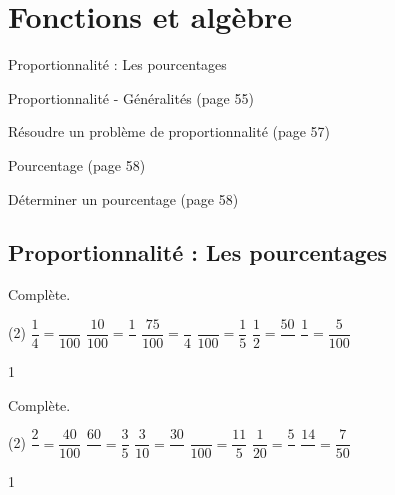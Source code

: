 \documentclass[a4paper,11pt]{report}
\begin{document}
\newcommand{\chapterName}{Fonctions et algèbre}
\newcommand{\serieName}{Proportionnalité : Les pourcentages}

\chapter*{\chapterName}
\thispagestyle{empty}

\begin{amL}{\serieName}{
\item Proportionnalité - Généralités (page 55)
\item Résoudre un problème de proportionnalité (page 57)
\item Pourcentage (page 58)
\item Déterminer un pourcentage (page 58)
}\end{amL}

\section*{\serieName}
\setcounter{page}{1}







\begin{exop}{
Complète.
\begin{tasks}(2)
    \task $\dfrac{1}{4}=\dfrac{}{100}$
    \task $\dfrac{10}{100}=\dfrac{1}{}$
    \task $\dfrac{75}{100}=\dfrac{}{4}$
    \task $\dfrac{}{100}=\dfrac{1}{5}$
    \task $\dfrac{1}{2}=\dfrac{50}{}$
    \task $\dfrac{1}{}=\dfrac{5}{100}$
\end{tasks}
}{1}    
\end{exop}

\begin{exop}{
Complète.
\begin{tasks}(2)
    \task $\dfrac{2}{}=\dfrac{40}{100}$
    \task $\dfrac{60}{}=\dfrac{3}{5}$
    \task $\dfrac{3}{10}=\dfrac{30}{}$
    \task $\dfrac{}{100}=\dfrac{11}{5}$
    \task $\dfrac{1}{20}=\dfrac{5}{}$
    \task $\dfrac{14}{}=\dfrac{7}{50}$
\end{tasks}
}{1}    
\end{exop}
\end{document}

